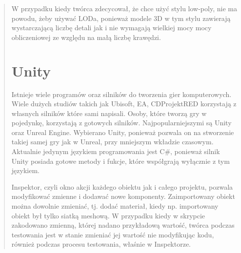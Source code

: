 \begin{quotation}
\indent W przypadku kiedy twórca zdecycował, że chce użyć stylu low-poly, nie ma powodu, żeby używać LODa, ponieważ modele 3D w tym stylu zawierają wystarczającą liczbę detali jak i nie wymagają wielkiej mocy mocy obliczeniowej ze względu na małą liczbę krawędzi.

\section{Unity}

\indent Istnieje wiele programów oraz silników do tworzenia gier komputerowych. Wiele dużych studiów takich jak Ubisoft, EA, CDProjektRED korzystają z własnych silników które sami napisali. Osoby, które tworzą gry w pojedynkę, korzystają z gotowych silników. Najpopularniejszymi są Unity oraz Unreal Engine. Wybierano Unity, ponieważ pozwala on na stworzenie takiej samej gry jak w Unreal, przy mniejszym wkładzie czasowym. Aktualnie jedynym językiem programowania jest C\#, ponieważ silnik Unity posiada gotowe metody i fukcje, które współgrają wyłącznie z tym językiem.

\indent Inspektor, czyli okno akcji każdego obiektu jak i całego projektu, pozwala modyfikować zmienne i dodawać nowe komponenty. Zaimportowany obiekt można dowolnie zmieniać, tj. dodać materiał, kiedy np. importowany obiekt był tylko siatką meshową. W przypadku kiedy w skrypcie zakodowano zmienną, której nadano przykładową wartość, twórca podczas testowania jest w stanie zmieniać jej wartość nie modyfikując kodu, również podczas procesu testowania, właśnie w Inspektorze. 

\end{quotation}
